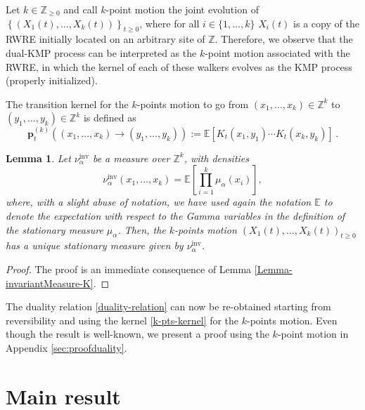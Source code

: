 \documentclass[a4paper,11pt,oneside,reqno]{amsart}
\newtheorem{lemma}[theorem]{Lemma}
\theoremstyle{definition}
\renewcommand{\geq}{\geqslant}
\numberwithin{equation}{section}
\begin{document}
Let $k\in \mathbb{Z}_{\geq 0}$ and call $k$-point motion the joint evolution of $\left\{(X_{1}(t),\ldots,X_{k}(t))\right\}_{t\geq 0}$, where for all $i\in \{1,\ldots,k\}$ $X_{i}(t)$ is a copy of the RWRE initially located on an arbitrary site of $\mathbb{Z}$.
Therefore, we observe that the dual-KMP process can be interpreted as the $k$-point motion associated with the RWRE, in which the kernel of each of these walkers evolves as the KMP process (properly initialized). 

The transition kernel for the $k$-points  motion to go from $(x_{1},\ldots,x_{k})\in \mathbb{Z}^{k}$ to $(y_{1},\ldots,y_{k})\in \mathbb{Z}^{k}$ is defined as
\begin{equation}\label{k-pts-kernel}
	\mathbf{p}_{t}^{(k)}((x_{1},\ldots,x_{k})\to (y_{1},\ldots,y_{k})):=\mathbb{E}\left[K_{t}(x_{1},y_{1})\cdots K_{t}(x_{k},y_{k})\right]\,.
\end{equation} 

\begin{lemma}\label{Lemma-invp2}
	Let $\nu^{\text{inv}}_{\alpha}$ be a measure over $\mathbb{Z}^{k}$, with densities $$\nu^{\text{inv}}_{\alpha}(x_{1},\ldots,x_{k})=\mathbb{E}\left[\prod_{i=1}^{k}\mu_{\alpha}(x_{i})\right],$$
	where, with a slight abuse of notation, we have used again the notation $\mathbb E$ to denote the expectation with respect to the Gamma variables in the definition of the stationary measure $\mu_{\alpha}$.  Then, the $k$-points motion $(X_{1}(t),\ldots,X_{k}(t))_{t\geq 0}$ has a unique stationary measure given by $\nu^{\text{inv}}_{\alpha}$. 
\end{lemma}
\begin{proof}
	The proof is an immediate consequence of Lemma \ref{Lemma-invariantMeasure-K}. 
\end{proof}
The duality relation \eqref{duality-relation} can now be re-obtained starting from reversibility and using the kernel \eqref{k-pts-kernel} for the $k$-points motion. Even though the result is well-known, we present a proof using the $k$-point motion in Appendix \ref{sec:proofduality}.  
\section{Main result}
\end{document}
